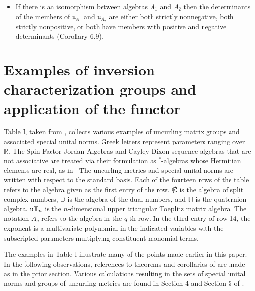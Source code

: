 \documentclass{amsart}
\numberwithin{equation}{section}
\theoremstyle{definition}
\numberwithin{theorem}{section}
\begin{document}
\begin{itemize}
\item If there is an isomorphism between algebras $A_1$ and $A_2$ then the determinants of the members of $\mathfrak{u}_{A_1}$ and $\mathfrak{u}_{A_2}$ are either  both strictly nonnegative, both strictly nonpositive, or both have members with positive and negative determinants (Corollary 6.9).
\end{itemize}

\section{Examples of inversion characterization groups and application of the functor}

Table I, taken from \cite{fgreensite:2023}, collects various examples of uncurling matrix groups and associated special unital norms.  Greek letters represent parameters ranging over $\mathbb{R}$.  The Spin Factor Jordan Algebras and Cayley-Dixon sequence algebras that are not associative are treated via their formulation as $^*$-algebras whose Hermitian elements are real, as in \cite{fgreensite:2023}. The uncurling metrics and special unital norms are written with respect to the standard basis.  Each of the fourteen rows of the table refers to the algebra given as the first entry of the row.  $\slashed{\mathbb{C}}$ is the algebra of split complex numbers, $\mathbb{D}$ is the algebra of the dual numbers, and $\mathbb{H}$ is the quaternion algebra.  ${\tt u}\mathbb{T}_n$ is the $n$-dimensional upper triangular Toeplitz matrix algebra.  The notation $A_q$ refers to the algebra in the $q$-th row.  In the third entry of row 14, the exponent is a multivariate polynomial in the indicated variables with the subscripted parameters multiplying constituent monomial terms.

The examples in Table I illustrate many of the points made earlier in this paper.  In the following observations, references to theorems and corollaries of \cite{fgreensite:2023} are made as in the prior section.  Various calculations resulting in the sets of special unital norms and groups of uncurling metrics are found in Section 4 and Section 5 of \cite{fgreensite:2023}.
\end{document}
